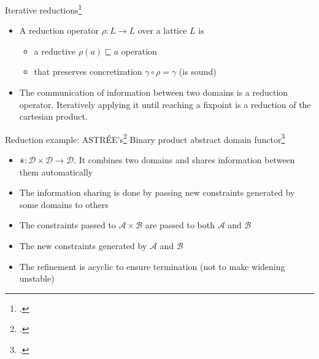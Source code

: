 \documentclass[aspectratio=169]{beamer}
\begin{document}
\begin{frame}{Iterative reductions\footcite{cousot2011reduced}}
  \small
  \begin{itemize}[<+->]
  \item A reduction operator $\rho: L \to L$ over a lattice $L$ is
    \begin{itemize}
    \item a reductive $\rho(a) \sqsubseteq a$ operation
    \item that preserves concretization $\gamma \circ \rho = \gamma$ (is sound)
    \end{itemize}
  \item The communication of information between two domains is a reduction operator. Iteratively applying it until reaching a fixpoint is a reduction of the cartesian product.
  \end{itemize}
\end{frame}

\begin{frame}{Reduction example: ASTRÉE's\footcite{cousot2005astree,cousot2007varieties} Binary product abstract domain functor\footcite{cousot2006combination}}
  \begin{itemize}[<+->]
  \item $\dottimes : \mathcal{D \times D} \to \mathcal{D}$. It combines two domains and shares information between them automatically
  \item The information sharing is done by passing new constraints generated by some domains to others
  \item The constraints passed to $\mathcal{A \times B}$ are passed to both $\mathcal{A}$ and $\mathcal{B}$
  \item The new constraints generated by $\mathcal{A}$ and $\mathcal{B}$
  \item The refinement is acyclic to ensure termination (not to make widening unstable)
  \end{itemize}
\end{frame}
\end{document}
